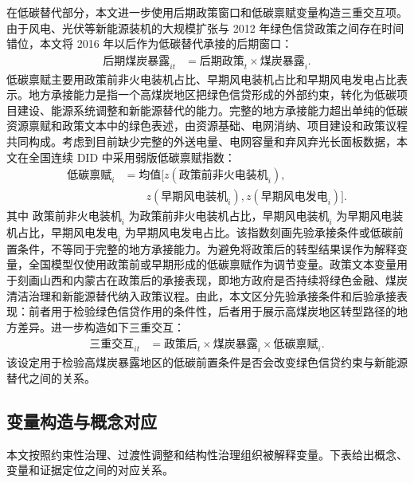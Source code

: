 \documentclass[UTF8,12pt]{ctexart}
\begin{document}
在低碳替代部分，本文进一步使用后期政策窗口和低碳禀赋变量构造三重交互项。由于风电、光伏等新能源装机的大规模扩张与 2012 年绿色信贷政策之间存在时间错位，本文将 2016 年以后作为低碳替代承接的后期窗口：
\[
    \begin{aligned}
    \text{后期煤炭暴露}_{it}
    &= \text{后期政策}_{t} \times \text{煤炭暴露}_{i}.
    \end{aligned}
\]
低碳禀赋主要用政策前非火电装机占比、早期风电装机占比和早期风电发电占比表示。地方承接能力是指一个高煤炭地区把绿色信贷形成的外部约束，转化为低碳项目建设、能源系统调整和新能源替代的能力。完整的地方承接能力超出单纯的低碳资源禀赋和政策文本中的绿色表述，由资源基础、电网消纳、项目建设和政策议程共同构成。考虑到目前缺少完整的外送电量、电网容量和弃风弃光长面板数据，本文在全国连续 DID 中采用弱版低碳禀赋指数：
\[
    \begin{aligned}
    \text{低碳禀赋}_{i}
    &= \text{均值}\big[
    z(\text{政策前非火电装机}_{i}), \\
    &\qquad
    z(\text{早期风电装机}_{i}),
    z(\text{早期风电发电}_{i})
    \big].
    \end{aligned}
\]
其中 $\text{政策前非火电装机}_{i}$ 为政策前非火电装机占比，$\text{早期风电装机}_{i}$ 为早期风电装机占比，$\text{早期风电发电}_{i}$ 为早期风电发电占比。该指数刻画先验承接条件或低碳前置条件，不等同于完整的地方承接能力。为避免将政策后的转型结果误作为解释变量，全国模型仅使用政策前或早期形成的低碳禀赋作为调节变量。政策文本变量用于刻画山西和内蒙古在政策后的承接表现，即地方政府是否持续将绿色金融、煤炭清洁治理和新能源替代纳入政策议程。由此，本文区分先验承接条件和后验承接表现：前者用于检验绿色信贷作用的条件性，后者用于展示高煤炭地区转型路径的地方差异。进一步构造如下三重交互：
\[
    \begin{aligned}
    \text{三重交互}_{it}
    &= \text{政策后}_{t} \times \text{煤炭暴露}_{i}
    \times \text{低碳禀赋}_{i}.
    \end{aligned}
\]
该设定用于检验高煤炭暴露地区的低碳前置条件是否会改变绿色信贷约束与新能源替代之间的关系。

\subsection{变量构造与概念对应}

本文按照约束性治理、过渡性调整和结构性治理组织被解释变量。下表给出概念、变量和证据定位之间的对应关系。
\end{document}
